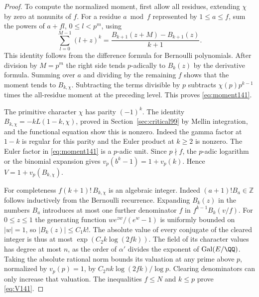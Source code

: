 \documentclass[a4paper,11pt]{article}
\theoremstyle{definition}
\theoremstyle{remark}
\newcommand{\ZZ}{\mathbb Z}\newcommand{\ord}{\operatorname{ord}}
\numberwithin{equation}{section}
\begin{document}
\begin{proof}
To compute the normalized moment, first allow all residues,
extending \(\chi\) by zero at nonunits of \(f\). For a residue
\(a\bmod f\) represented by \(1\le a\le f\), sum the powers of
\(a+f l\), \(0\le l<p^m\), using
\[
   \sum_{l=0}^{M-1}(l+z)^k
      =\frac{B_{k+1}(z+M)-B_{k+1}(z)}{k+1}.
\]
This identity follows from the difference formula for Bernoulli
polynomials. After division by \(M=p^m\) the right side tends
\(p\)-adically to \(B_k(z)\) by the derivative formula. Summing
over \(a\) and dividing by the remaining \(f\) shows that the
moment tends to \(B_{k,\chi}\). Subtracting the terms divisible
by \(p\) subtracts \(\chi(p)p^{k-1}\) times the all-residue
moment at the preceding level. This proves \eqref{eq:moment141}.

The primitive character \(\chi\) has parity \((-1)^k\).
The identity \(B_{k,\chi}=-kL(1-k,\chi)\), proved in
Section~\ref{sec:critical99} by Mellin integration, and the
functional equation show this is nonzero. Indeed the gamma factor at
\(1-k\) is regular for this parity and the Euler product at
\(k\ge2\) is nonzero. The Euler factor in \eqref{eq:moment141}
is a \(p\)-adic unit. Since \(p\nmid f\), the \(p\)-adic
logarithm or the binomial expansion gives
\(v_p(b^k-1)=1+v_p(k)\). Hence \(V=1+v_p(B_{k,\chi})\).

For completeness \(f(k+1)!\,B_{k,\chi}\) is an algebraic integer.
Indeed \((a+1)!B_a\in\ZZ\) follows inductively from the Bernoulli
recurrence. Expanding \(B_k(z)\) in the numbers \(B_a\)
introduces at most one further denominator \(f\) in
\(f^{k-1}B_k(v/f)\). For \(0\le z\le1\) the generating function
\(w e^{zw}/(e^w-1)\) is uniformly bounded on \(|w|=1\),
so \(|B_k(z)|\le C_1k!\). The absolute value of every conjugate
of the cleared integer is thus at most
\(\exp(C_2 k\log(2fk))\). The field of its character values
has degree at most \(n\), as the order of \(\alpha'\) divides
the exponent of \(\operatorname{Gal}(E/\QQ)\). Taking the
absolute rational norm bounds its valuation at any prime
above \(p\), normalized by \(v_p(p)=1\), by
\(C_2 n k\log(2fk)/\log p\). Clearing denominators can only
increase that valuation. The inequalities \(f\le N\) and
\(k\le p\) prove \eqref{eq:V141}.
\end{proof}
\end{document}
